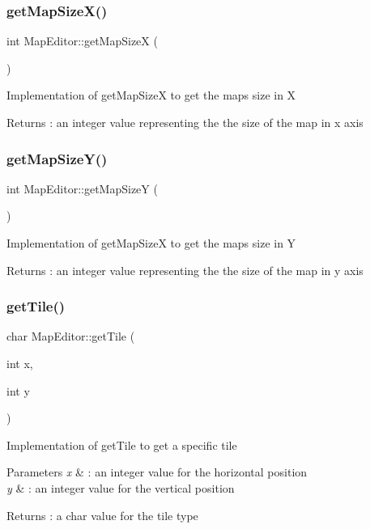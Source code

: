 \subsubsection{\texorpdfstring{get\+Map\+Size\+X()}{getMapSizeX()}}
{\footnotesize\ttfamily int Map\+Editor\+::get\+Map\+SizeX (\begin{DoxyParamCaption}{ }\end{DoxyParamCaption})}

Implementation of get\+Map\+SizeX to get the map\textquotesingle{}s size in X \begin{DoxyReturn}{Returns}
\+: an integer value representing the the size of the map in x axis 
\end{DoxyReturn}
\hypertarget{class_map_editor_a2f538a32e1f2de6f1ddd224e17838ec5}{}\label{class_map_editor_a2f538a32e1f2de6f1ddd224e17838ec5} 
\subsubsection{\texorpdfstring{get\+Map\+Size\+Y()}{getMapSizeY()}}
{\footnotesize\ttfamily int Map\+Editor\+::get\+Map\+SizeY (\begin{DoxyParamCaption}{ }\end{DoxyParamCaption})}

Implementation of get\+Map\+SizeX to get the map\textquotesingle{}s size in Y \begin{DoxyReturn}{Returns}
\+: an integer value representing the the size of the map in y axis 
\end{DoxyReturn}
\hypertarget{class_map_editor_a9fee49a6d578b6f39766c4ed46707770}{}\label{class_map_editor_a9fee49a6d578b6f39766c4ed46707770} 
\subsubsection{\texorpdfstring{get\+Tile()}{getTile()}}
{\footnotesize\ttfamily char Map\+Editor\+::get\+Tile (\begin{DoxyParamCaption}\item[{int}]{x,  }\item[{int}]{y }\end{DoxyParamCaption})}

Implementation of get\+Tile to get a specific tile 
\begin{DoxyParams}{Parameters}
{\em x} & \+: an integer value for the horizontal position \\
\hline
{\em y} & \+: an integer value for the vertical position \\
\hline
\end{DoxyParams}
\begin{DoxyReturn}{Returns}
\+: a char value for the tile type 
\end{DoxyReturn}
\hypertarget{class_map_editor_a00a6d6fe02c11f0aa9a4a8f844f1437a}{}\label{class_map_editor_a00a6d6fe02c11f0aa9a4a8f844f1437a} 
